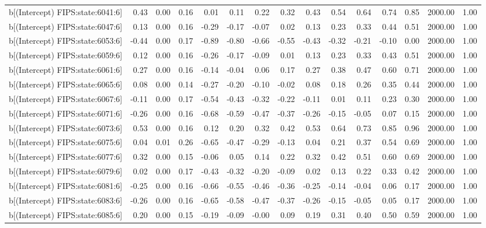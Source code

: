 \begin{table}[ht]
\begin{tabular}{rrrrrrrrrrrrrrr}
  b[(Intercept) FIPS:state:6041:6] & 0.43 & 0.00 & 0.16 & 0.01 & 0.11 & 0.22 & 0.32 & 0.43 & 0.54 & 0.64 & 0.74 & 0.85 & 2000.00 & 1.00 \\ 
  b[(Intercept) FIPS:state:6047:6] & 0.13 & 0.00 & 0.16 & -0.29 & -0.17 & -0.07 & 0.02 & 0.13 & 0.23 & 0.33 & 0.44 & 0.51 & 2000.00 & 1.00 \\ 
  b[(Intercept) FIPS:state:6053:6] & -0.44 & 0.00 & 0.17 & -0.89 & -0.80 & -0.66 & -0.55 & -0.43 & -0.32 & -0.21 & -0.10 & 0.00 & 2000.00 & 1.00 \\ 
  b[(Intercept) FIPS:state:6059:6] & 0.12 & 0.00 & 0.16 & -0.26 & -0.17 & -0.09 & 0.01 & 0.13 & 0.23 & 0.33 & 0.43 & 0.51 & 2000.00 & 1.00 \\ 
  b[(Intercept) FIPS:state:6061:6] & 0.27 & 0.00 & 0.16 & -0.14 & -0.04 & 0.06 & 0.17 & 0.27 & 0.38 & 0.47 & 0.60 & 0.71 & 2000.00 & 1.00 \\ 
  b[(Intercept) FIPS:state:6065:6] & 0.08 & 0.00 & 0.14 & -0.27 & -0.20 & -0.10 & -0.02 & 0.08 & 0.18 & 0.26 & 0.35 & 0.44 & 2000.00 & 1.00 \\ 
  b[(Intercept) FIPS:state:6067:6] & -0.11 & 0.00 & 0.17 & -0.54 & -0.43 & -0.32 & -0.22 & -0.11 & 0.01 & 0.11 & 0.23 & 0.30 & 2000.00 & 1.00 \\ 
  b[(Intercept) FIPS:state:6071:6] & -0.26 & 0.00 & 0.16 & -0.68 & -0.59 & -0.47 & -0.37 & -0.26 & -0.15 & -0.05 & 0.07 & 0.15 & 2000.00 & 1.00 \\ 
  b[(Intercept) FIPS:state:6073:6] & 0.53 & 0.00 & 0.16 & 0.12 & 0.20 & 0.32 & 0.42 & 0.53 & 0.64 & 0.73 & 0.85 & 0.96 & 2000.00 & 1.00 \\ 
  b[(Intercept) FIPS:state:6075:6] & 0.04 & 0.01 & 0.26 & -0.65 & -0.47 & -0.29 & -0.13 & 0.04 & 0.21 & 0.37 & 0.54 & 0.69 & 2000.00 & 1.00 \\ 
  b[(Intercept) FIPS:state:6077:6] & 0.32 & 0.00 & 0.15 & -0.06 & 0.05 & 0.14 & 0.22 & 0.32 & 0.42 & 0.51 & 0.60 & 0.69 & 2000.00 & 1.00 \\ 
  b[(Intercept) FIPS:state:6079:6] & 0.02 & 0.00 & 0.17 & -0.43 & -0.32 & -0.20 & -0.09 & 0.02 & 0.13 & 0.22 & 0.33 & 0.42 & 2000.00 & 1.00 \\ 
  b[(Intercept) FIPS:state:6081:6] & -0.25 & 0.00 & 0.16 & -0.66 & -0.55 & -0.46 & -0.36 & -0.25 & -0.14 & -0.04 & 0.06 & 0.17 & 2000.00 & 1.00 \\ 
  b[(Intercept) FIPS:state:6083:6] & -0.26 & 0.00 & 0.16 & -0.65 & -0.58 & -0.47 & -0.37 & -0.26 & -0.15 & -0.05 & 0.05 & 0.17 & 2000.00 & 1.00 \\ 
  b[(Intercept) FIPS:state:6085:6] & 0.20 & 0.00 & 0.15 & -0.19 & -0.09 & -0.00 & 0.09 & 0.19 & 0.31 & 0.40 & 0.50 & 0.59 & 2000.00 & 1.00 \\ 

\end{tabular}
\end{table}

